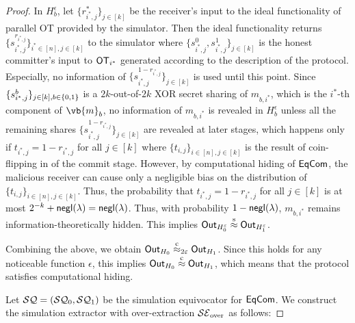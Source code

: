 \begin{proof}
In $H^\epsilon_b$, let $\{r^*_{i^*,j}\}_{j\in[k]}$ be the receiver's input to the ideal functionality of parallel OT provided by the simulator. Then the ideal functionality returns $\{s_{i^*,j}^{r_{i^*,j}}\}_{i^*\in[n],j\in[k]}$ to the simulator where $\{s_{i^*,j}^{0},s_{i^*,j}^{1}\}_{j\in[k]}$ is the honest committer's input to $\mathsf{OT}_{i^*}$ generated according to the description of the protocol. Especially, no information of $\{s_{i^*,j}^{1-r_{i^*,j}}\}_{j\in[k]}$ is used until this point. Since $\{s_{i^*,j}^{b}\}_{j\in[k],b\in\{0,1\}}$ is a $2k$-out-of-$2k$ XOR secret sharing of $m_{b,i^*}$, which is the $i^*$-th component of $\vb{m}_b$, no information of $m_{b,i^*}$ is revealed in $H_b^\epsilon$ unless all the remaining shares $\{s_{i^*,j}^{1-r_{i^*,j}}\}_{j\in[k]}$ are revealed at later stages, which happens only if $t_{i^*,j}=1-r_{i^*,j}$ for all $j\in[k]$ where $\{t_{i,j}\}_{i\in [n],j\in[k]}$ is the result of coin-flipping in  of the commit stage. However, by computational hiding of $\mathsf{EqCom}$, the malicious receiver can cause only a negligible bias on the distribution of $\{t_{i,j}\}_{i\in [n],j\in[k]}$. Thus, the probability that $t_{i^*,j}=1-r_{i^*,j}$ for all $j\in[k]$ is at most $2^{-k}+\mathsf{negl}(\lambda)=\mathsf{negl}(\lambda)$. Thus, with probability $1-\mathsf{negl}(\lambda)$, $m_{b,i^*}$ remains information-theoretically hidden. This implies $\mathsf{Out}_{H^\varepsilon_0} \stackrel{\text{s}}{\approx} \mathsf{Out}_{H^\varepsilon_1}$. 

Combining the above, we obtain 
$\mathsf{Out}_{H_0} \stackrel{\text{c}}{\approx}_{2\varepsilon} \mathsf{Out}_{H_1}$. Since this holds for any noticeable function $\epsilon$, this implies $\mathsf{Out}_{H_0} \stackrel{\text{c}}{\approx} \mathsf{Out}_{H_1}$, which means that the protocol satisfies computational hiding.


Let $\mathcal{SQ}=(\mathcal{SQ}_0,\mathcal{SQ}_1)$ be the simulation equivocator for $\mathsf{EqCom}$. We construct the simulation extractor with over-extraction $\mathcal{SE}_{\mathrm{over}}$ as follows: 


\end{proof}
